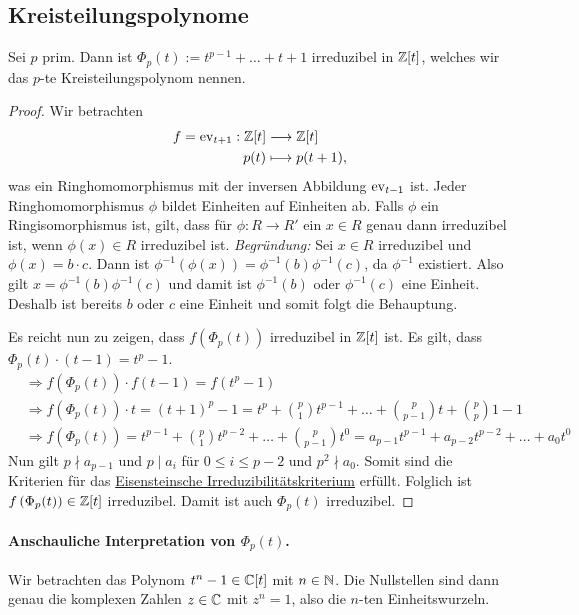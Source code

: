 \documentclass[12pt,a4paper]{scrartcl}
\begin{document}

\subsection{Kreisteilungspolynome}\label{sec:kreisteil}
\begin{anw}
Sei $p$ prim. Dann ist $\Phi_p(t) := t^{p-1}+\dots +t+1$ irreduzibel in $\mathbb Z[t]$, welches wir das $p$-te Kreisteilungspolynom nennen.
\end{anw}

\begin{proof}
	Wir betrachten
	\begin{align*}
		f = \operatorname{ev}_{t+1} : \mathbb Z[t] &\longrightarrow \mathbb Z[t] \\
		p(t) &\longmapsto p(t+1) ,
	\end{align*}
	was ein Ringhomomorphismus mit der inversen Abbildung $\operatorname{ev}_{t-1}$ ist. Jeder Ringhomomorphismus $\phi$ bildet Einheiten auf Einheiten ab. Falls $\phi$ ein Ringisomorphismus ist, gilt, dass für $\phi: R \to R'$ ein $x \in R$ genau dann irreduzibel ist, wenn $\phi(x) \in R$ irreduzibel ist.
	\textit{Begründung:} Sei $x \in R$ irreduzibel und $\phi(x) = b\cdot c$. Dann ist $\phi^{-1}\left( \phi (x) \right) = \phi^{-1} (b) \phi^{-1} (c) $, da $\phi^{-1}$ existiert. Also gilt $x = \phi^{-1} (b) \phi^{-1} (c) $ und damit ist $\phi^{-1}(b)$ oder $\phi^{-1}(c)$ eine Einheit. Deshalb ist bereits $b$ oder $c$ eine Einheit und somit folgt die Behauptung.
	
	Es reicht nun zu zeigen, dass $f\left(\Phi_p(t) \right) $ irreduzibel in $\mathbb Z[t]$ ist. Es gilt, dass $\Phi_p(t)\cdot(t-1) = t^p - 1$.
	\begin{align*}
		&\Rightarrow f(\Phi_p(t))\cdot f(t-1) = f(t^p - 1) \\
		&\Rightarrow f(\Phi_p(t)) \cdot t = (t + 1)^p - 1 = t^p + \binom{p}{1}t^{p-1} + \dots + \binom{p}{p-1} t + \binom{p}{p} 1 - 1 \\
		&\Rightarrow f(\Phi_p(t)) = t^{p-1} + \binom{p}{1}t^{p-2} + \dots + \binom{p}{p-1}t^0 = a_{p-1}t^{p-1} + a_{p-2}t^{p-2} + \dots + a_0t^0
	\end{align*}
	Nun gilt $p \nmid a_{p-1}$ und $p \mid a_i$ für $0 \leq i \leq p-2$ und $p^2 \nmid a_0$. Somit sind die Kriterien für das \hyperref[thm:eisenstein]{Eisensteinsche Irreduzibilitätskriterium} erfüllt. Folglich ist $f\left( \Phi_p(t) \right) \in \mathbb Z[t]$ irreduzibel. Damit ist auch $\Phi_p(t)$ irreduzibel.
\end{proof}

\paragraph{Anschauliche Interpretation von $\Phi_p(t)$.} Wir betrachten das Polynom $t^n-1 \in \mathbb C[t]$ mit $n \in \mathbb N$. Die Nullstellen sind dann genau die komplexen Zahlen $z \in \mathbb C$ mit $z^n = 1$, also die $n$-ten Einheitswurzeln. 
\end{document}
